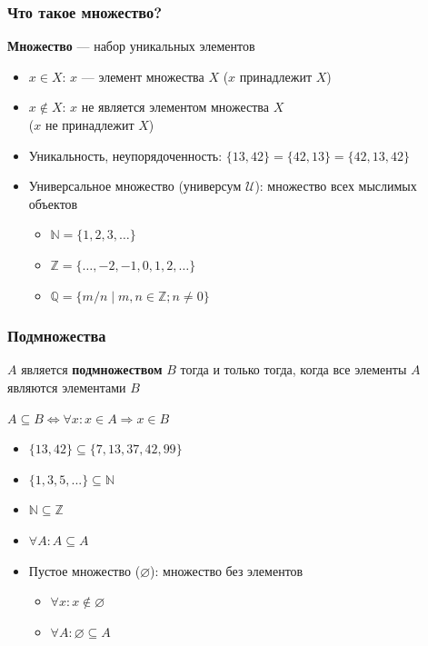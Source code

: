 \documentclass{beamer}
\begin{document}
\begin{frame}[fragile]
  \transwipe[direction=90]
  \frametitle{Что такое множество?}
  \pause

\begin{center}
    \textbf{Множество} --- набор уникальных элементов
\end{center}

  \pause
  \begin{itemize}
    \item $x \in X$: $x$ --- элемент множества $X$ ($x$ принадлежит $X$)
    \item $x \notin X$: $x$ не является элементом множества $X$ \\ ($x$ не принадлежит $X$)
    \item Уникальность, неупорядоченность: $\{ 13, 42 \} = \{ 42, 13 \} = \{ 42, 13, 42 \}$
    \item Универсальное множество (универсум $\mathcal{U}$): множество всех мыслимых объектов
    \begin{itemize}
      \item $\mathbb{N} = \{ 1, 2, 3, \dots \}$
      \item $\mathbb{Z} = \{ \dots, -2, -1, 0, 1, 2, \dots \}$
      \item $\mathbb{Q} = \{ m / n \mid m, n \in \mathbb{Z}; n \neq 0 \}$
    \end{itemize}
  \end{itemize}
\end{frame}

\begin{frame}[fragile]
  \transwipe[direction=90]
  \frametitle{Подмножества}
  $A$ является \textbf{подмножеством} $B$ тогда и только тогда, когда все элементы $A$ являются элементами $B$

  \begin{center}
     $ A \subseteq B \iff \forall x : x \in A \Rightarrow x \in B $
  \end{center}

  \pause
  \begin{itemize}
    \item $\{ 13, 42 \} \subseteq \{ 7, 13, 37, 42, 99 \}$
    \item $\{ 1, 3, 5, ...\} \subseteq \mathbb{N} $
    \item $\mathbb{N} \subseteq \mathbb{Z}$
    \item $\forall A : A \subseteq A$
  \end{itemize}
  \begin{itemize}
    \item Пустое множество ($\varnothing$): множество без элементов
    \begin{itemize}
      \item $\forall x : x \notin \varnothing$
      \item $\forall A : \varnothing \subseteq A$
    \end{itemize}
  \end{itemize}
\end{frame}
\end{document}
